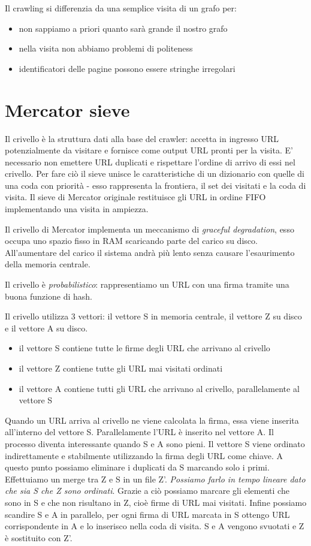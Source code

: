 \documentclass[12pt,italian]{report}
\begin{document}
Il crawling si differenzia da una semplice visita di un grafo per:
\begin{itemize}
    \item non sappiamo a priori quanto sarà grande il nostro grafo
    \item nella visita non abbiamo problemi di politeness
    \item identificatori delle pagine possono essere stringhe irregolari
\end{itemize}

\section{Mercator sieve}
\label{sec:Mercator sieve}
Il crivello è la struttura dati alla base del crawler: accetta in ingresso URL potenzialmente da visitare e fornisce come output URL pronti per la visita. E' necessario non emettere URL duplicati e rispettare l'ordine di arrivo di essi nel crivello. Per fare ciò il sieve unisce le caratteristiche di un dizionario con quelle di una coda con priorità - esso rappresenta la frontiera, il set dei visitati e la coda di visita. Il sieve di Mercator originale restituisce gli URL in ordine FIFO implementando una visita in ampiezza.

Il crivello di Mercator implementa un meccanismo di \textit{graceful degradation}, esso occupa uno spazio fisso in RAM scaricando parte del carico su disco. All'aumentare del carico il sistema andrà più lento senza causare l'esaurimento della memoria centrale. 

Il crivello è \textit{probabilistico}: rappresentiamo un URL con una firma tramite una buona funzione di hash. 

Il crivello utilizza 3 vettori: il vettore S in memoria centrale, il vettore Z su disco e il vettore A su disco.
\begin{itemize}
    \item il vettore S contiene tutte le firme degli URL che arrivano al crivello
    \item il vettore Z contiene tutte gli URL mai visitati ordinati
    \item il vettore A contiene tutti gli URL che arrivano al crivello, parallelamente al vettore S
\end{itemize}

Quando un URL arriva al crivello ne viene calcolata la firma, essa viene inserita all'interno del vettore S. Parallelamente l'URL è inserito nel vettore A. 
Il processo diventa interessante quando S e A sono pieni. Il vettore S viene ordinato indirettamente e stabilmente utilizzando la firma degli URL come chiave. A questo punto possiamo eliminare i duplicati da S marcando solo i primi. Effettuiamo un merge tra Z e S in un file Z'. \textit{Possiamo farlo in tempo lineare dato che sia S che Z sono ordinati}. Grazie a ciò possiamo marcare gli elementi che sono in S e che non risultano in Z, cioè firme di URL mai visitati. Infine possiamo scandire S e A in parallelo, per ogni firma di URL marcata in S ottengo URL corrispondente in A e lo inserisco nella coda di visita. S e A vengono svuotati e Z è sostituito con Z'.
\end{document}
